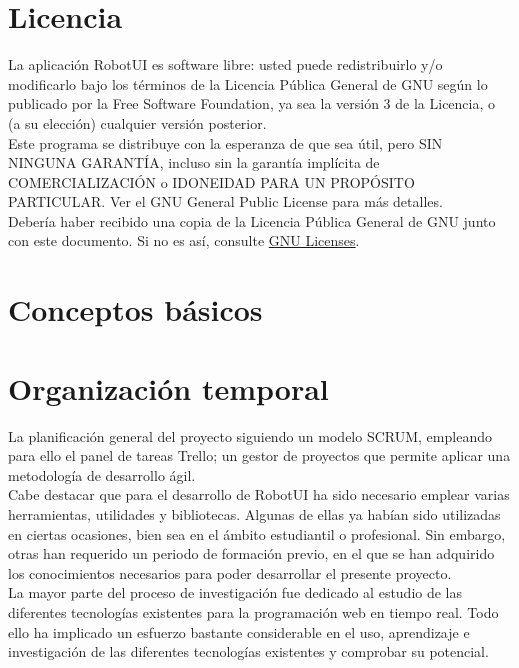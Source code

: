 \documentclass[a4paper,12pt]{article}
\begin{document}
\section{Licencia}

La aplicación RobotUI es software libre: usted puede redistribuirlo y/o modificarlo bajo los términos de la Licencia Pública General de GNU según lo publicado por la Free Software Foundation, ya sea la versión 3 
de la Licencia, o (a su elección) cualquier versión posterior.\\

Este programa se distribuye con la esperanza de que sea útil, pero SIN NINGUNA GARANTÍA, incluso sin la garantía implícita de COMERCIALIZACIÓN o IDONEIDAD PARA UN PROPÓSITO PARTICULAR. Ver el GNU
General Public License para más detalles.\\

Debería haber recibido una copia de la Licencia Pública General de GNU junto con este documento. Si no es así, consulte \href{http://www.gnu.org/licenses/}{GNU Licenses}.\\


\section{Conceptos básicos}



\section{Organización temporal}

La planificación general del proyecto siguiendo un modelo SCRUM, empleando para ello el panel de tareas Trello; un gestor de proyectos que permite aplicar una metodología de desarrollo ágil.\\

Cabe destacar que para el desarrollo de RobotUI ha sido necesario emplear varias herramientas, utilidades y bibliotecas. Algunas de ellas ya habían sido utilizadas en ciertas ocasiones, bien sea en el ámbito estudiantil o profesional. 
Sin embargo, otras han requerido un periodo de formación previo, en el que se han adquirido los conocimientos necesarios para poder desarrollar el presente proyecto.\\

La mayor parte del proceso de investigación fue dedicado al estudio de las diferentes tecnologías existentes para la programación web en tiempo real. Todo ello ha implicado un esfuerzo bastante considerable en el uso, 
aprendizaje e investigación de las diferentes tecnologías existentes y comprobar su potencial.\\
\end{document}
